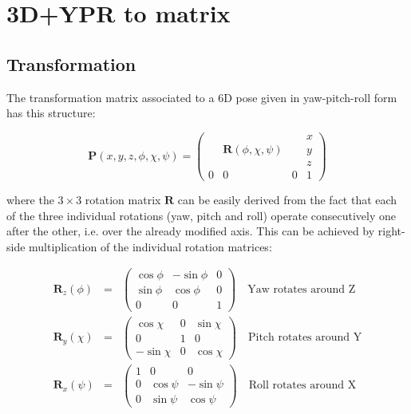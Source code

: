 \documentclass[a4paper,10pt]{report}
\begin{document}
\section{3D+YPR to matrix }
\label{sect:ypr2mat}

\subsection{Transformation}

The transformation matrix associated to a 6D pose given in yaw-pitch-roll form has this structure:

\begin{equation}
\mathbf{P}(x,y,z,\phi,\chi,\psi)=\left(
  \begin{array}{ccc|c}
   & & & x \\
   & \mathbf{R}(\phi,\chi,\psi) & & y \\
   & & & z \\ \hline
   0 & 0 & 0& 1
  \end{array}
\right)
\label{eq:matP_ypr}
\end{equation}

\noindent where the $3 \times 3$ rotation matrix $\mathbf{R}$ can be easily derived 
from the fact that each of the three individual rotations (yaw, pitch and roll) operate
consecutively one after the other, i.e. over the already modified axis. 
This can be achieved by right-side multiplication of the individual rotation matrices:

\begin{eqnarray}
\mathbf{R}_z(\phi) &=& 
\left(
\begin{array}{ccc}
\cos \phi & -\sin \phi & 0 \\
\sin \phi & \cos \phi & 0 \\
0 & 0 & 1
\end{array}
\right) \quad \mathrm{\text{Yaw rotates around Z}} \\
\mathbf{R}_y(\chi) &= &
\left(
\begin{array}{ccc}
\cos \chi & 0 & \sin \chi \\
0 & 1 & 0 \\
-\sin \chi & 0 & \cos \chi
\end{array}
\right) \quad \mathrm{\text{Pitch rotates around Y}} \\
\mathbf{R}_x(\psi) &=& 
\left(
\begin{array}{ccc}
1 & 0 & 0 \\
0 & \cos \psi & -\sin \psi \\
0 & \sin \psi &  \cos \psi 
\end{array}
\right) \quad \mathrm{\text{Roll rotates around X}} 
\end{eqnarray}
\end{document}
